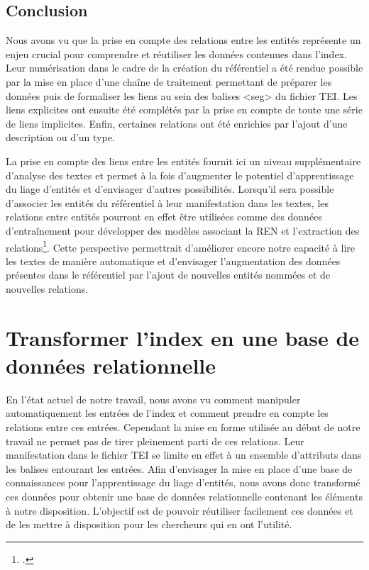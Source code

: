 \documentclass[a4paper,12pt,twoside]{book}
\begin{document}
	\section*{Conclusion}
	
	Nous avons vu que la prise en compte des relations entre les entités représente un enjeu crucial pour comprendre et réutiliser les données contenues dans l'index. Leur numérisation dans le cadre de la création du référentiel a été rendue possible par la mise en place d'une chaîne de traitement permettant de préparer les données puis de formaliser les liens au sein des balises <seg> du fichier TEI. Les liens explicites ont ensuite été complétés par la prise en compte de toute une série de liens implicites. Enfin, certaines relations ont été enrichies par l'ajout d'une description ou d'un type.
	
	La prise en compte des liens entre les entités fournit ici un niveau supplémentaire d'analyse des textes et permet à la fois d'augmenter le potentiel d'apprentissage du liage d'entités et d'envisager d'autres possibilités. Lorsqu'il sera possible d'associer les entités du référentiel à leur manifestation dans les textes, les relations entre entités pourront en effet être utilisées comme des données d'entraînement pour développer des modèles associant la REN et l'extraction des relations\footcite[p. 169--180]{dupont_structuration_2017}. Cette perspective permettrait d'améliorer encore notre capacité à lire les textes de manière automatique et d'envisager l'augmentation des données présentes dans le référentiel par l'ajout de nouvelles entités nommées et de nouvelles relations.
	
	\chapter{Transformer l’index en une base de données relationnelle}
	
	En l'état actuel de notre travail, nous avons vu comment manipuler automatiquement les entrées de l'index et comment prendre en compte les relations entre ces entrées. Cependant la mise en forme utilisée au début de notre travail ne permet pas de tirer pleinement parti de ces relations. Leur manifestation dans le fichier TEI se limite en effet à un ensemble d'attributs dans les balises entourant les entrées. Afin d'envisager la mise en place d'une base de connaissances pour l'apprentissage du liage d'entités, nous avons donc transformé ces données pour obtenir une base de données relationnelle contenant les éléments à notre disposition. L'objectif est de pouvoir réutiliser facilement ces données et de les mettre à disposition pour les chercheurs qui en ont l'utilité.
	
\end{document}
